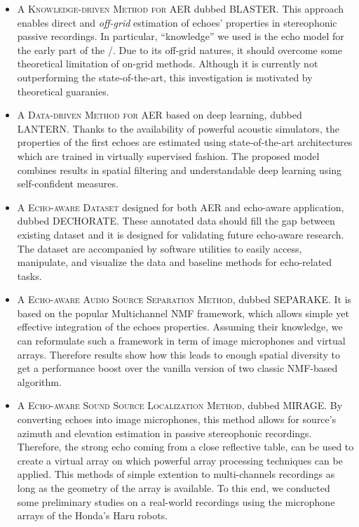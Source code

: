 \begin{itemize}

    \item A \textsc{Knowledge-driven Method for AER} dubbed \acs{BLASTER}.
    This approach enables direct and \textit{off-grid} estimation of echoes' properties in stereophonic passive recordings.
    In particular, ``knowledge'' we used is the echo model for the early part of the \RIRs/.
    Due to its off-grid natures, it should overcome some theoretical limitation of on-grid methods.
    Although it is currently not outperforming the state-of-the-art, this investigation is motivated by theoretical guaranies.

    \item A \textsc{Data-driven Method for AER} based on deep learning, dubbed \acs{LANTERN}.
    Thanks to the availability of powerful acoustic simulators, the properties of the first echoes are estimated using state-of-the-art architectures which are trained in virtually supervised fashion.
    The proposed model combines results in spatial filtering and understandable deep learning using self-confident measures.

    \item A \textsc{Echo-aware Dataset} designed for both AER and echo-aware application, dubbed \acs{DECHORATE}.
    These annotated data should fill the gap between existing dataset and it is designed for validating future echo-aware research.
    The dataset are accompanied by software utilities to easily access, manipulate, and visualize the data and baseline methods for echo-related tasks.

    \item A \textsc{Echo-aware Audio Source Separation Method}, dubbed \acs{SEPARAKE}.
    It is based on the popular Multichannel NMF framework, which allows simple yet effective integration of the echoes properties.
    Assuming their knowledge, we can reformulate such a framework in term of image microphones and virtual arrays.
    Therefore results show how this leads to enough spatial diversity to get a performance boost over the vanilla version of two classic NMF-based algorithm.

    \item A \textsc{Echo-aware Sound Source Localization Method}, dubbed \acs{MIRAGE}.
    By converting echoes into image microphones, this method allows for source's azimuth and elevation estimation in passive stereophonic recordings.
    Therefore, the strong echo coming from a close reflective table, can be used to create a virtual array on which powerful array processing techniques can be applied.
    This methods of simple extention to multi-channels recordings as long as the geometry of the array is available.
    To this end, we conducted some preliminary studies on a real-world recordings using the microphone arrays of the Honda's Haru robots.


\end{itemize}
